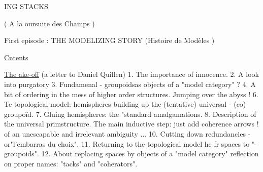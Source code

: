 ING STACKS

( A la oursuite des Champs )

First episode : THE MODELIZING STORY
(Histoire de Modèles )

\uline{Cntents} \hand{,}

 \uline{The ake-off} (a letter to Daniel Quillen)
1. The importance of innocence.
2. A  look into purgatory
3. Fundamenal \hand{$\infty$}- groupoidsas objects of a "model category" ?
4. A bit of ordering in the mess of higher order structures.
 Jumping over the abyss !
6. Te topological model: hemispheres building up the (tentative)
universal \hand{$\infty$}- (co) groupoïd.
7. Gluing hemispheres: the "standard amalgamations.
8. Description of the universal prim\hand{/}structure.
 The main inductive step: just add coherence arrows !    
  of an \hand{(}unescapable and irrelevant\hand{)} ambiguity ...
10. Cutting down redundancies - or\hand{:}"l'embarras du choix".
11. Returning to the topological model \hand{(} he  
 fr spaces to "\unsure{$\infty$}-groupoids"\hand{)}.
12. About replacing spaces by objects of a "model category" 
   reflection on proper names: "tacks" and "coherators".
